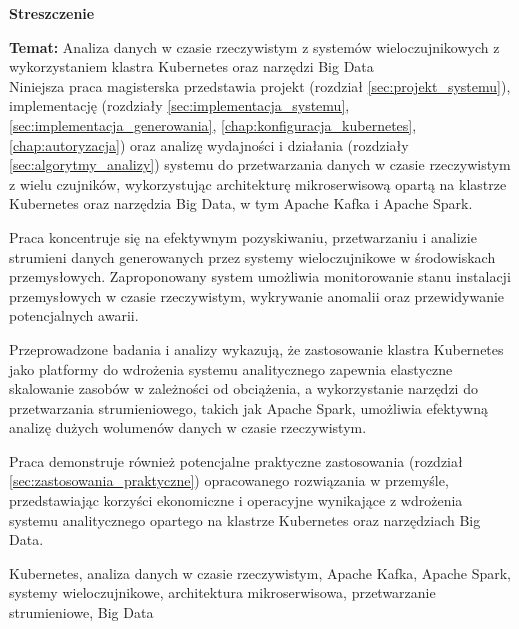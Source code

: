 \begin{abstract_pl}
\begin{center}
\textbf{\large Streszczenie}
\end{center}
\vspace{0.5em}

\noindent\textbf{Temat:} Analiza danych w czasie rzeczywistym z systemów wieloczujnikowych z wykorzystaniem klastra Kubernetes oraz narzędzi Big Data\\

Niniejsza praca magisterska przedstawia projekt (rozdział \ref{sec:projekt_systemu}), implementację (rozdziały \ref{sec:implementacja_systemu}, \ref{sec:implementacja_generowania}, \ref{chap:konfiguracja_kubernetes}, \ref{chap:autoryzacja}) oraz analizę wydajności i działania (rozdziały \ref{sec:algorytmy_analizy}) systemu do przetwarzania danych w czasie rzeczywistym z wielu czujników, wykorzystując architekturę mikroserwisową opartą na klastrze Kubernetes oraz narzędzia Big Data, w tym Apache Kafka i Apache Spark.

Praca koncentruje się na efektywnym pozyskiwaniu, przetwarzaniu i analizie strumieni danych generowanych przez systemy wieloczujnikowe w środowiskach przemysłowych. Zaproponowany system umożliwia monitorowanie stanu instalacji przemysłowych w czasie rzeczywistym, wykrywanie anomalii oraz przewidywanie potencjalnych awarii.

Przeprowadzone badania i analizy wykazują, że zastosowanie klastra Kubernetes jako platformy do wdrożenia systemu analitycznego zapewnia elastyczne skalowanie zasobów w zależności od obciążenia, a wykorzystanie narzędzi do przetwarzania strumieniowego, takich jak Apache Spark, umożliwia efektywną analizę dużych wolumenów danych w czasie rzeczywistym.

Praca demonstruje również potencjalne praktyczne zastosowania (rozdział \ref{sec:zastosowania_praktyczne}) opracowanego rozwiązania w przemyśle, przedstawiając korzyści ekonomiczne i operacyjne wynikające z wdrożenia systemu analitycznego opartego na klastrze Kubernetes oraz narzędziach Big Data.

\begin{keywords}
Kubernetes, analiza danych w czasie rzeczywistym, Apache Kafka, Apache Spark, systemy wieloczujnikowe, architektura mikroserwisowa, przetwarzanie strumieniowe, Big Data
\end{keywords}
\end{abstract_pl}